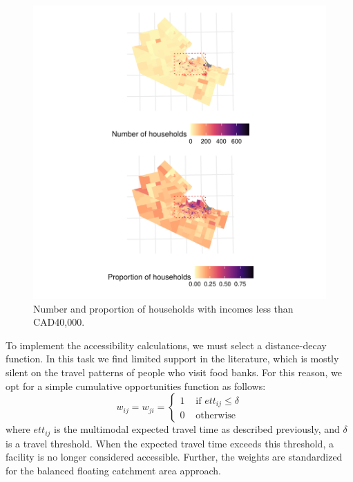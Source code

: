 \documentclass[]{elsarticle} %
\begin{document}
\begin{figure}
\includegraphics[width=1\linewidth]{Accessibility-Foodbanks-Hamilton_files/figure-latex/plot-low-income-households-1} \caption{\label{fig:low-income-households}Number and proportion of households with incomes less than CAD40,000.}\label{fig:plot-low-income-households}
\end{figure}

To implement the accessibility calculations, we must select a
distance-decay function. In this task we find limited support in the
literature, which is mostly silent on the travel patterns of people who
visit food banks. For this reason, we opt for a simple cumulative
opportunities function as follows: \[
w_{ij}=w_{ji}=
\begin{cases}
1 & \text{ if } ett_{ij}\le \delta\\
0 & \text{ otherwise}
\end{cases}
\] \noindent where \(ett_{ij}\) is the multimodal expected travel time
as described previously, and \(\delta\) is a travel threshold. When the
expected travel time exceeds this threshold, a facility is no longer
considered accessible. Further, the weights are standardized for the
balanced floating catchment area approach.
\end{document}

